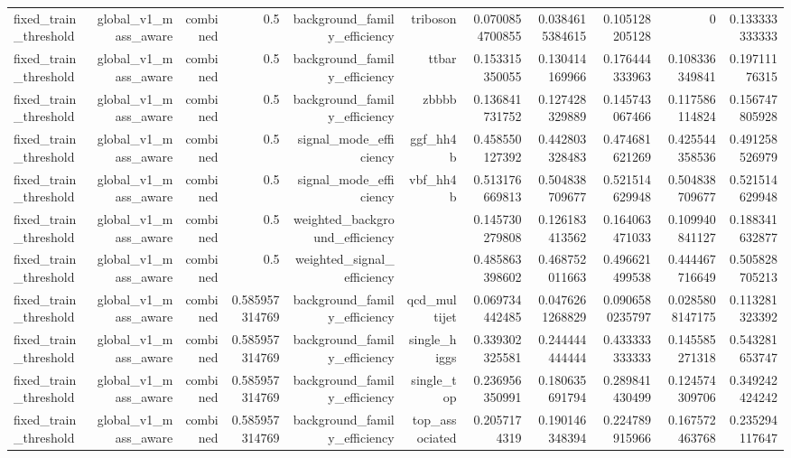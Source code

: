\begin{table}[htbp]
{\begin{tabular}{lrrrrrrrrrr}
fixed\_train\_threshold & global\_v1\_mass\_aware & combined & 0.5 & background\_family\_efficiency & triboson & 0.0700854700855 & 0.0384615384615 & 0.105128205128 & 0 & 0.133333333333 \\
fixed\_train\_threshold & global\_v1\_mass\_aware & combined & 0.5 & background\_family\_efficiency & ttbar & 0.153315350055 & 0.130414169966 & 0.176444333963 & 0.108336349841 & 0.19711176315 \\
fixed\_train\_threshold & global\_v1\_mass\_aware & combined & 0.5 & background\_family\_efficiency & zbbbb & 0.136841731752 & 0.127428329889 & 0.145743067466 & 0.117586114824 & 0.156747805928 \\
fixed\_train\_threshold & global\_v1\_mass\_aware & combined & 0.5 & signal\_mode\_efficiency & ggf\_hh4b & 0.458550127392 & 0.442803328483 & 0.474681621269 & 0.425544358536 & 0.491258526979 \\
fixed\_train\_threshold & global\_v1\_mass\_aware & combined & 0.5 & signal\_mode\_efficiency & vbf\_hh4b & 0.513176669813 & 0.504838709677 & 0.521514629948 & 0.504838709677 & 0.521514629948 \\
fixed\_train\_threshold & global\_v1\_mass\_aware & combined & 0.5 & weighted\_background\_efficiency &  & 0.145730279808 & 0.126183413562 & 0.164063471033 & 0.109940841127 & 0.188341632877 \\
fixed\_train\_threshold & global\_v1\_mass\_aware & combined & 0.5 & weighted\_signal\_efficiency &  & 0.485863398602 & 0.468752011663 & 0.496621499538 & 0.444467716649 & 0.505828705213 \\
fixed\_train\_threshold & global\_v1\_mass\_aware & combined & 0.585957314769 & background\_family\_efficiency & qcd\_multijet & 0.069734442485 & 0.0476261268829 & 0.0906580235797 & 0.0285808147175 & 0.113281323392 \\
fixed\_train\_threshold & global\_v1\_mass\_aware & combined & 0.585957314769 & background\_family\_efficiency & single\_higgs & 0.339302325581 & 0.244444444444 & 0.433333333333 & 0.145585271318 & 0.543281653747 \\
fixed\_train\_threshold & global\_v1\_mass\_aware & combined & 0.585957314769 & background\_family\_efficiency & single\_top & 0.236956350991 & 0.180635691794 & 0.289841430499 & 0.124574309706 & 0.349242424242 \\
fixed\_train\_threshold & global\_v1\_mass\_aware & combined & 0.585957314769 & background\_family\_efficiency & top\_associated & 0.2057174319 & 0.190146348394 & 0.224789915966 & 0.167572463768 & 0.235294117647 \\

\end{tabular}}
\end{table}
